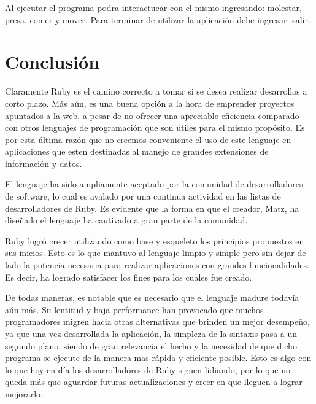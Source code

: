 \documentclass{article}
\begin{document}
Al ejecutar el programa podra interactucar con el mismo ingresando: molestar, presa, comer y mover.
Para terminar de utilizar la aplicación debe ingresar: salir.

\section{Conclusión}

	Claramente Ruby es el camino correcto a tomar si se desea realizar desarrollos a corto plazo. Más aún, es una buena opción a la hora de emprender proyectos apuntados a la web, a pesar de no ofrecer una apreciable eficiencia comparado con otros lenguajes de programación que son útiles para el mismo propósito. Es por esta última razón que no creemos conveniente el uso de este lenguaje en aplicaciones que esten destinadas al manejo de grandes extensiones de información y datos.
	\par
	El lenguaje ha sido ampliamente aceptado por la comunidad de desarrolladores de software, lo cual es avalado por una continua actividad en las listas de desarrolladores de Ruby. Es evidente que la forma en que el creador, Matz, ha diseñado el lenguaje ha cautivado a gran parte de la comunidad.
	\par
	Ruby logró crecer utilizando como base y esqueleto los principios propuestos en sus inicios. Esto es lo que mantuvo al lenguaje limpio y simple pero sin dejar de lado la potencia necesaria para realizar aplicaciones con grandes funcionalidades. Es decir, ha logrado satisfacer los fines para los cuales fue creado.
	\par
	De todas maneras, es notable que es necesario que el lenguaje madure todavía aún más. Su lentitud y baja performance han provocado que muchos programadores migren hacia otras alternativas que brinden un mejor desempeño, ya que una vez desarrollada la aplicación, la simpleza de la sintaxis pasa a un segundo plano, siendo de gran relevancia el hecho y la necesidad de que dicho programa se ejecute de la manera mas rápida y eficiente posible. Esto es algo con lo que hoy en día los desarrolladores de Ruby siguen lidiando, por lo que no queda más que aguardar futuras actualizaciones y creer en que lleguen a lograr mejorarlo.
\end{document}
